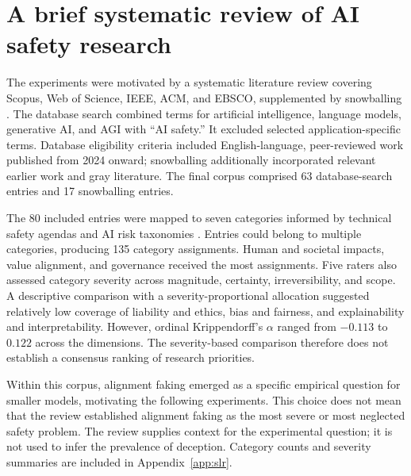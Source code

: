 \section{A brief systematic review of AI safety research}
\label{sec:slr}

The experiments were motivated by a systematic literature review covering Scopus, Web of Science, IEEE, ACM, and EBSCO, supplemented by snowballing \citep{wohlin_guidelines_2014}. The database search combined terms for artificial intelligence, language models, generative AI, and AGI with ``AI safety.'' It excluded selected application-specific terms. Database eligibility criteria included English-language, peer-reviewed work published from 2024 onward; snowballing additionally incorporated relevant earlier work and gray literature. The final corpus comprised 63 database-search entries and 17 snowballing entries.

The 80 included entries were mapped to seven categories informed by technical safety agendas and AI risk taxonomies \citep{hendrycks2021unsolved,Slattery_2026}. Entries could belong to multiple categories, producing 135 category assignments. Human and societal impacts, value alignment, and governance received the most assignments. Five raters also assessed category severity across magnitude, certainty, irreversibility, and scope. A descriptive comparison with a severity-proportional allocation suggested relatively low coverage of liability and ethics, bias and fairness, and explainability and interpretability. However, ordinal Krippendorff's $\alpha$ ranged from $-0.113$ to $0.122$ across the dimensions. The severity-based comparison therefore does not establish a consensus ranking of research priorities.

Within this corpus, alignment faking emerged as a specific empirical question for smaller models, motivating the following experiments. This choice does not mean that the review established alignment faking as the most severe or most neglected safety problem. The review supplies context for the experimental question; it is not used to infer the prevalence of deception. Category counts and severity summaries are included in Appendix~\ref{app:slr}.

